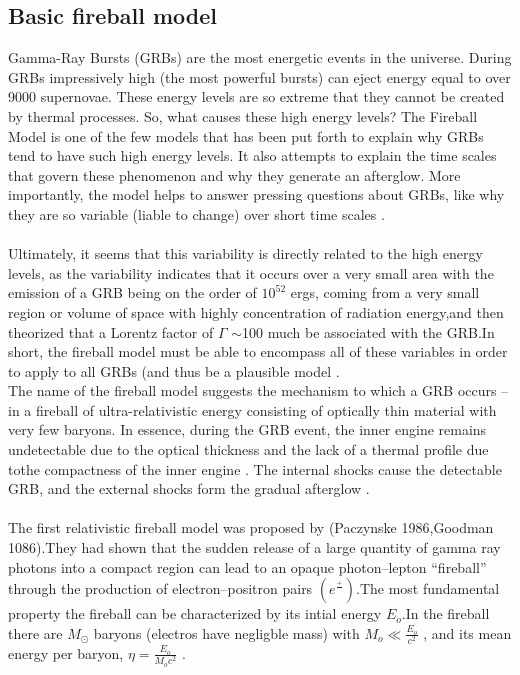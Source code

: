 \subsection{ Basic fireball model}
Gamma-Ray Bursts (GRBs) are  the most energetic events in the universe. During GRBs impressively high (the most powerful bursts) can eject energy equal to over 9000 supernovae. These energy levels are so extreme that they cannot be created by thermal processes. So, what causes these high energy levels?
The Fireball Model is one of the few models that has been put forth to explain why GRBs tend to have such high energy levels. It also attempts to explain the time scales that govern these phenomenon and why they generate an afterglow. More importantly, the model helps  to answer pressing questions about GRBs, like why they are so variable (liable to change) over short time scales \citep {13} \citep{14}.\\\\ 
Ultimately, it seems that this variability is directly related to the high energy levels, as the variability indicates that it occurs over a very small area with the emission of a GRB being on the order of $10^{52}$ ergs, coming from a very small  region or volume of space with highly concentration of radiation energy,and then  theorized that a Lorentz factor of $ \Gamma $ $ \sim $100 much be associated with the GRB.In short, the fireball model must be able to encompass all of these variables in order to apply to all GRBs (and thus be a plausible model \citep {14}.\\
The name of the fireball model suggests the mechanism to which a GRB occurs -- in a fireball of ultra-relativistic energy consisting of optically thin material with very few baryons. In essence, during the GRB event, the inner engine remains undetectable due to the optical thickness and the lack of a thermal profile due tothe compactness of the inner engine . The internal shocks cause the detectable GRB, and the external shocks form the gradual afterglow \citep{15}.\\\\
 The first relativistic fireball model was proposed by (Paczynske 1986,Goodman 1086).They had shown that the sudden release of a large quantity of gamma ray photons into a compact region can lead to an opaque photon–lepton “fireball” through the production of electron–positron pairs $(e^{\frac{+}{}})$.The most fundamental property the fireball can be characterized by its intial energy $ E_{o}$.In the fireball there are $ M_{\odot} $ baryons (electros have negligble mass)  with $ M_{o} \ll\frac{E_{o}}{c^{2}}$ , and its mean energy per baryon, $\eta = \frac{E_{o}}{M_{o}c^{2}}$ \citep{14} \citep{15}.\\\\
